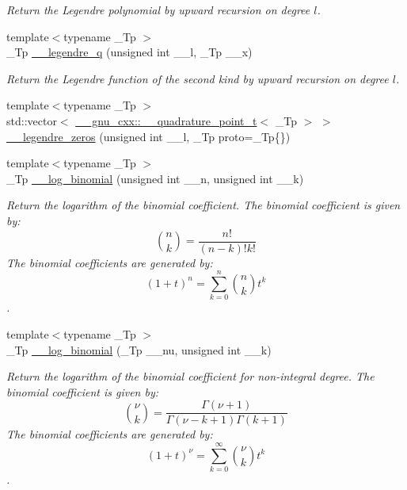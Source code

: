 \begin{DoxyCompactItemize}
\begin{DoxyCompactList}\small\item\em Return the Legendre polynomial by upward recursion on degree $ l $. \end{DoxyCompactList}\item 
{\footnotesize template$<$typename \+\_\+\+Tp $>$ }\\\+\_\+\+Tp \hyperlink{namespacestd_1_1____detail_a0643760e0d1701df4db880b2ad969055}{\+\_\+\+\_\+legendre\+\_\+q} (unsigned int \+\_\+\+\_\+l, \+\_\+\+Tp \+\_\+\+\_\+x)
\begin{DoxyCompactList}\small\item\em Return the Legendre function of the second kind by upward recursion on degree $ l $. \end{DoxyCompactList}\item 
{\footnotesize template$<$typename \+\_\+\+Tp $>$ }\\std\+::vector$<$ \hyperlink{struct____gnu__cxx_1_1____quadrature__point__t}{\+\_\+\+\_\+gnu\+\_\+cxx\+::\+\_\+\+\_\+quadrature\+\_\+point\+\_\+t}$<$ \+\_\+\+Tp $>$ $>$ \hyperlink{namespacestd_1_1____detail_a9d53ac0fd39232190e7564fa067a878d}{\+\_\+\+\_\+legendre\+\_\+zeros} (unsigned int \+\_\+\+\_\+l, \+\_\+\+Tp proto=\+\_\+\+Tp\{\})
\item 
{\footnotesize template$<$typename \+\_\+\+Tp $>$ }\\\+\_\+\+Tp \hyperlink{namespacestd_1_1____detail_a087d65f98ba6a6709b4d62fa32445e59}{\+\_\+\+\_\+log\+\_\+binomial} (unsigned int \+\_\+\+\_\+n, unsigned int \+\_\+\+\_\+k)
\begin{DoxyCompactList}\small\item\em Return the logarithm of the binomial coefficient. The binomial coefficient is given by\+: \[ \binom{n}{k} = \frac{n!}{(n-k)! k!} \] The binomial coefficients are generated by\+: \[ \left(1 + t\right)^n = \sum_{k=0}^n \binom{n}{k} t^k \]. \end{DoxyCompactList}\item 
{\footnotesize template$<$typename \+\_\+\+Tp $>$ }\\\+\_\+\+Tp \hyperlink{namespacestd_1_1____detail_af8613458310f575d1a1b162553abe4aa}{\+\_\+\+\_\+log\+\_\+binomial} (\+\_\+\+Tp \+\_\+\+\_\+nu, unsigned int \+\_\+\+\_\+k)
\begin{DoxyCompactList}\small\item\em Return the logarithm of the binomial coefficient for non-\/integral degree. The binomial coefficient is given by\+: \[ \binom{\nu}{k} = \frac{\Gamma(\nu+1)}{\Gamma(\nu-k+1) \Gamma(k+1)} \] The binomial coefficients are generated by\+: \[ \left(1 + t\right)^\nu = \sum_{k=0}^\infty \binom{\nu}{k} t^k \]. \end{DoxyCompactList}\item 

\end{DoxyCompactItemize}
